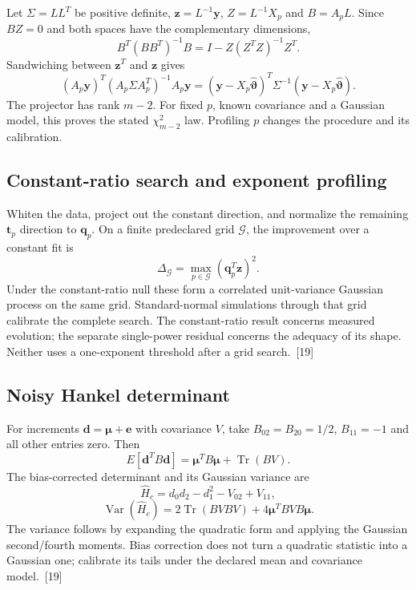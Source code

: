\documentclass[10pt,twocolumn,letterpaper]{article}
\newcommand{\Tr}{\operatorname{Tr}}
\newcommand{\Var}{\operatorname{Var}}
\begin{document}
Let $\Sigma=LL^T$ be positive definite, $\bm z=L^{-1}\bm y$, $Z=L^{-1}X_p$ and $B=A_pL$. Since $BZ=0$ and both spaces have the complementary dimensions,
\[
 B^T(BB^T)^{-1}B=I-Z(Z^TZ)^{-1}Z^T.
\]
Sandwiching between $\bm z^T$ and $\bm z$ gives
\[
 (A_p\bm y)^T(A_p\Sigma A_p^T)^{-1}A_p\bm y
 =(\bm y-X_p\widehat{\bm\vartheta})^T\Sigma^{-1}
 (\bm y-X_p\widehat{\bm\vartheta}).
\]
The projector has rank $m-2$. For fixed $p$, known covariance and a Gaussian model, this proves the stated $\chi^2_{m-2}$ law. Profiling $p$ changes the procedure and its calibration.

\subsection{Constant-ratio search and exponent profiling}
Whiten the data, project out the constant direction, and normalize the remaining $\bm t_p$ direction to $\bm q_p$. On a finite predeclared grid $\mathcal G$, the improvement over a constant fit is
\[
 \Delta_{\mathcal G}=\max_{p\in\mathcal G}(\bm q_p^T\bm z)^2.
\]
Under the constant-ratio null these form a correlated unit-variance Gaussian process on the same grid. Standard-normal simulations through that grid calibrate the complete search. The constant-ratio result concerns measured evolution; the separate single-power residual concerns the adequacy of its shape. Neither uses a one-exponent threshold after a grid search.~[19]

\subsection{Noisy Hankel determinant}
For increments $\bm d=\bm\mu+\bm e$ with covariance $V$, take $B_{02}=B_{20}=1/2$, $B_{11}=-1$ and all other entries zero. Then
\[
 E[\bm d^TB\bm d]=\bm\mu^TB\bm\mu+\Tr(BV).
\]
The bias-corrected determinant and its Gaussian variance are
\[
 \widehat H_c=d_0d_2-d_1^2-V_{02}+V_{11},
\]
\[
 \Var(\widehat H_c)=2\Tr(BVBV)+4\bm\mu^TBVB\bm\mu.
\]
The variance follows by expanding the quadratic form and applying the Gaussian second/fourth moments. Bias correction does not turn a quadratic statistic into a Gaussian one; calibrate its tails under the declared mean and covariance model.~[19]
\end{document}
